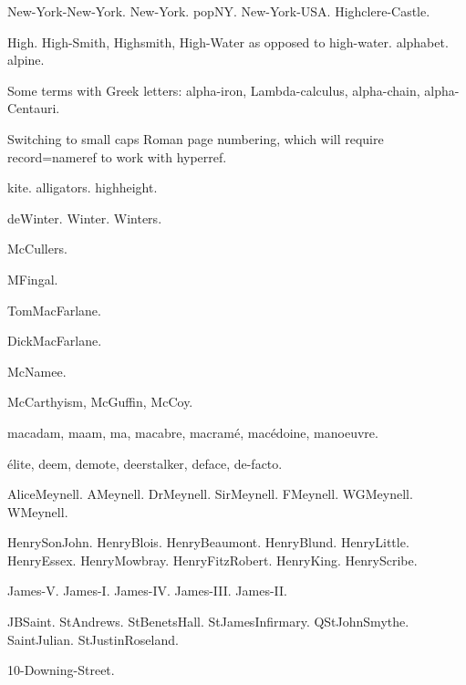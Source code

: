 \documentclass{article}
\newcommand*{\myscroman}[1]{%
  \myscromannum{\value{#1}}%
}
\newcommand*{\myscromannum}[1]{%
  \textsc{\romannumeral#1}%
}
\begin{document}
\gls{New-York-New-York}. \gls{New-York}. 
\Gls{popNY}. \gls{New-York-USA}.
\gls{Highclere-Castle}.

\gls{High}. \gls{High-Smith}, \gls{Highsmith}, \gls{High-Water}
as opposed to \gls{high-water}. \Gls{alphabet}. \Gls{alpine}.

Some terms with Greek letters: \gls{alpha-iron}, 
\gls{Lambda-calculus}, \gls{alpha-chain}, \gls{alpha-Centauri}.

\newpage

\renewcommand{\thepage}{\myscroman{page}}%
Switching to small caps Roman page numbering, which will require
record=nameref to work with hyperref.

\Gls{kite}. \Glspl{alligator}. \Gls{highheight}.

\gls{deWinter}.
\gls{Winter}.
\gls{Winters}.

\gls{McCullers}.

\gls{MFingal}.

\gls{TomMacFarlane}.

\gls{DickMacFarlane}.

\gls{McNamee}.

\gls{McCarthyism},
\gls{McGuffin},
\gls{McCoy}.

\Gls{macadam},
\gls{maam},
\gls{ma},
\gls{macabre},
\gls{macramé},
\gls{macédoine},
\gls{manoeuvre}.

\Gls{élite},
\gls{deem},
\gls{demote},
\gls{deerstalker},
\gls{deface},
\gls{de-facto}.


\gls{AliceMeynell}.
\gls{AMeynell}.
\gls{DrMeynell}.
\gls{SirMeynell}.
\gls{FMeynell}.
\gls{WGMeynell}.
\gls{WMeynell}.

\gls{HenrySonJohn}. \gls{HenryBlois}.
\gls{HenryBeaumont}. \gls{HenryBlund}.
\gls{HenryLittle}. \gls{HenryEssex}. \gls{HenryMowbray}.
\gls{HenryFitzRobert}.
\gls{HenryKing}. \gls{HenryScribe}.

\gls{James-V}.
\gls{James-I}.
\gls{James-IV}.
\gls{James-III}.
\gls{James-II}.

\gls{JBSaint}.
\gls{StAndrews}.
\gls{StBenetsHall}.
\gls{StJamesInfirmary}.
\gls{QStJohnSmythe}.
\gls{SaintJulian}.
\gls{StJustinRoseland}.

\gls{10-Downing-Street}.

\newpage

\renewcommand{\glsxtrbookindexcols}{3}

\renewcommand*{\glsxtrbookindexprelocation}[1]{%
  \glsxtrifhasfield{location}{#1}%
  {\dotfill}%
  {\glsxtrprelocation}%
}

\printunsrtglossary
 [
   title={Index},
   preamble={Locations in bold indicate primary reference.
   (Word sort.)}
 ]
\end{document}
